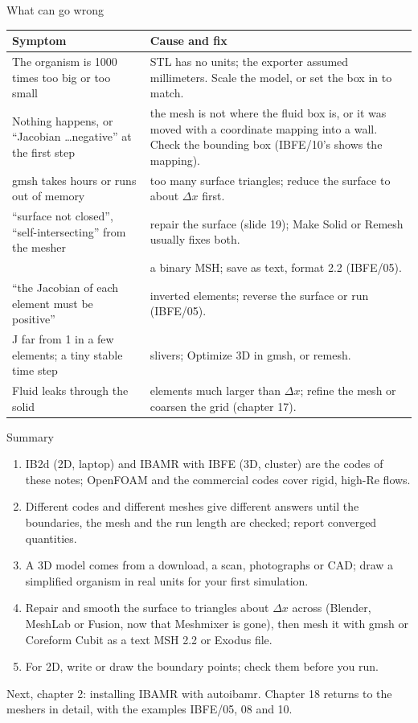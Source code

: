 \documentclass[aspectratio=169,11pt]{beamer}
\begin{document}
\begin{frame}{What can go wrong}
\scriptsize
\begin{tabular}{@{}L{0.34\textwidth}L{0.59\textwidth}@{}}
\toprule
Symptom & Cause and fix\\
\midrule
The organism is 1000 times too big or too small & STL has no units; the exporter assumed millimeters. Scale the model, or set the box in  to match.\\
Nothing happens, or ``Jacobian \ldots negative'' at the first step & the mesh is not where the fluid box is, or it was moved with a coordinate mapping into a wall. Check the bounding box (IBFE/10's  shows the mapping).\\
gmsh takes hours or runs out of memory & too many surface triangles; reduce the surface to about $\Delta x$ first.\\
``surface not closed'', ``self-intersecting'' from the mesher & repair the surface (slide 19); Make Solid or Remesh usually fixes both.\\
 & a binary MSH; save as text, format 2.2 (IBFE/05).\\
``the Jacobian of each element must be positive'' & inverted elements; reverse the surface or run  (IBFE/05).\\
J far from 1 in a few elements; a tiny stable time step & slivers; Optimize 3D in gmsh, or remesh.\\
Fluid leaks through the solid & elements much larger than $\Delta x$; refine the mesh or coarsen the grid (chapter 17).\\
\bottomrule
\end{tabular}
\end{frame}

\begin{frame}{Summary}
\begin{enumerate}
  \item IB2d (2D, laptop) and IBAMR with IBFE (3D, cluster) are the codes of these notes; OpenFOAM and the commercial codes cover rigid, high-Re flows.
  \item Different codes and different meshes give different answers until the boundaries, the mesh and the run length are checked; report converged quantities.
  \item A 3D model comes from a download, a scan, photographs or CAD; draw a simplified organism in real units for your first simulation.
  \item Repair and smooth the surface to triangles about $\Delta x$ across (Blender, MeshLab or Fusion, now that Meshmixer is gone), then mesh it with gmsh or Coreform Cubit as a text MSH 2.2 or Exodus file.
  \item For 2D, write or draw the boundary points; check them before you run.
\end{enumerate}
\vspace{3mm}
\begin{homebox}
\small Next, chapter 2: installing IBAMR with autoibamr. Chapter 18 returns to the meshers in detail, with the examples IBFE/05, 08 and 10.
\end{homebox}
\end{frame}
\end{document}
